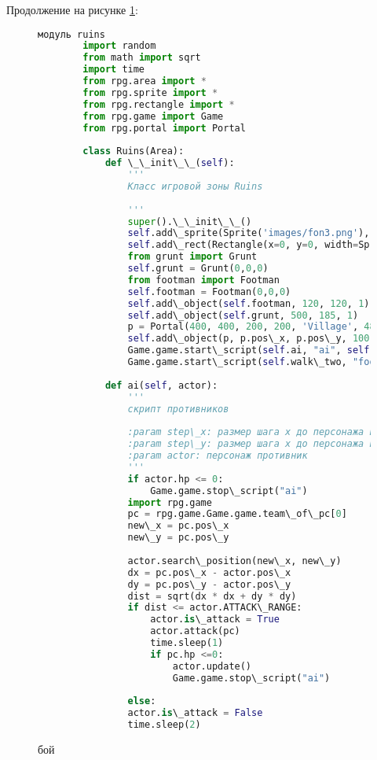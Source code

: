 Продолжение на рисунке \ref{battle2:image}:
\begin{figure}[H]
	\begin{lstlisting}[language=Python]
		модуль ruins
		import random
		from math import sqrt
		import time
		from rpg.area import *
		from rpg.sprite import *
		from rpg.rectangle import *
		from rpg.game import Game
		from rpg.portal import Portal
		
		class Ruins(Area):
			def \_\_init\_\_(self):
				'''
				Класс игровой зоны Ruins
		
				'''
				super().\_\_init\_\_()
				self.add\_sprite(Sprite('images/fon3.png'), 590, 400, 0)
				self.add\_rect(Rectangle(x=0, y=0, width=Sprite('images/fon3.png').image.width(), height=Sprite('images/fon3.png').image.height()))
				from grunt import Grunt
				self.grunt = Grunt(0,0,0)
				from footman import Footman
				self.footman = Footman(0,0,0)
				self.add\_object(self.footman, 120, 120, 1)
				self.add\_object(self.grunt, 500, 185, 1)
				p = Portal(400, 400, 200, 200, 'Village', 480, 100)
				self.add\_object(p, p.pos\_x, p.pos\_y, 100)
				Game.game.start\_script(self.ai, "ai", self.grunt)
				Game.game.start\_script(self.walk\_two, "footman", 50, 50)
				
			def ai(self, actor):
				'''
				скрипт противников
				
				:param step\_x: размер шага x до персонажа игрока
				:param step\_y: размер шага x до персонажа игрока
				:param actor: персонаж противник
				'''
				if actor.hp <= 0:
					Game.game.stop\_script("ai")
				import rpg.game
				pc = rpg.game.Game.game.team\_of\_pc[0]
				new\_x = pc.pos\_x
				new\_y = pc.pos\_y
				
				actor.search\_position(new\_x, new\_y)
				dx = pc.pos\_x - actor.pos\_x
				dy = pc.pos\_y - actor.pos\_y
				dist = sqrt(dx * dx + dy * dy)
				if dist <= actor.ATTACK\_RANGE:
					actor.is\_attack = True
					actor.attack(pc)
					time.sleep(1)
					if pc.hp <=0:
						actor.update()
						Game.game.stop\_script("ai")
			
				else:
				actor.is\_attack = False
				time.sleep(2)
\end{lstlisting}  
\caption{бой}
\label{battle2:image}
\end{figure}
